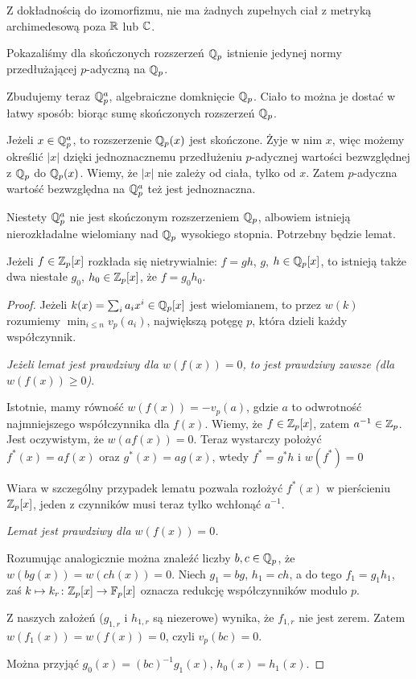\begin{fakt}
	Z dokładnością do izomorfizmu, nie ma żadnych zupełnych ciał z metryką archimedesową poza $\mathbb R$ lub $\mathbb C$.
\end{fakt}

Pokazaliśmy dla skończonych rozszerzeń $\mathbb Q_p$ istnienie jedynej normy przedłużającej $p$-adyczną na $\mathbb Q_p$.

Zbudujemy teraz $\mathbb Q_p^a$, algebraiczne domknięcie $\mathbb Q_p$.
Ciało to można je dostać w łatwy sposób: biorąc sumę skończonych rozszerzeń $\mathbb Q_p$.

Jeżeli $x \in \mathbb Q_p^a$, to rozszerzenie $\mathbb Q_p(x)$ jest skończone.
Żyje w nim $x$, więc możemy określić $|x|$ dzięki jednoznacznemu przedłużeniu $p$-adycznej wartości bezwzględnej z $\mathbb Q_p$ do $\mathbb Q_p(x)$.
Wiemy, że $|x|$ nie zależy od ciała, tylko od $x$.
Zatem $p$-adyczna wartość bezwzględna na $\mathbb Q_p^a$ też jest jednoznaczna.

Niestety $\mathbb Q_p^a$ nie jest skończonym rozszerzeniem $\mathbb Q_p$, albowiem istnieją nierozkładalne wielomiany nad $\mathbb Q_p$ wysokiego stopnia.
Potrzebny będzie lemat.

\begin{lemat}
	Jeżeli $f \in \mathbb Z_p[x]$ rozkłada się nietrywialnie: $f = gh$, $g$, $h \in \mathbb Q_p[x]$, to istnieją także dwa niestałe $g_0$, $h_0 \in \mathbb Z_p[x]$, że $f = g_0 h_0$.
\end{lemat}

\begin{proof}
	Jeżeli $k(x) = \sum_i a_i x^i \in \mathbb Q_p[x]$ jest wielomianem, to przez $w(k)$ rozumiemy $\min_{i \le n} v_p(a_i)$, największą potęgę $p$, która dzieli każdy współczynnik.

	\emph{Jeżeli lemat jest prawdziwy dla $w(f(x)) = 0$, to jest prawdziwy zawsze (dla $w(f(x)) \ge 0$)}.

	Istotnie, mamy równość $w(f(x)) = - v_p(a)$, gdzie $a$ to odwrotność najmniejszego współczynnika dla $f(x)$.
	Wiemy, że $f \in \mathbb Z_p[x]$, zatem $a^{-1} \in \mathbb Z_p$.
	Jest oczywistym, że $w(af(x)) = 0$.
	Teraz wystarczy położyć $f^*(x) = af(x)$ oraz $g^*(x) = ag(x)$, wtedy $f^* = g^*h$ i $w(f^*) =0$

	Wiara w szczególny przypadek lematu pozwala rozłożyć $f^*(x)$ w pierścieniu $\mathbb Z_p[x]$, jeden z czynników musi teraz tylko wchłonąć $a^{-1}$.

	\emph{Lemat jest prawdziwy dla $w(f(x)) = 0$.}

	Rozumując analogicznie można znaleźć liczby $b,c \in \mathbb Q_p$, że $w(bg(x)) = w(ch(x)) = 0$.
	Niech $g_1 = bg$, $h_1 = ch$, a do tego $f_1 = g_1 h_1$, zaś $k \mapsto k_r \colon \mathbb Z_p[x] \to \mathbb F_p[x]$ oznacza redukcję współczynników modulo $p$.

	Z naszych założeń ($g_{1,r}$ i $h_{1,r}$ są niezerowe) wynika, że $f_{1,r}$ nie jest zerem.
	Zatem $w(f_1(x)) = w(f(x)) = 0$, czyli $v_p(bc) = 0$.

	Można przyjąć $g_0(x) = (bc)^{-1}g_1(x)$, $h_0(x) = h_1(x)$.
\end{proof}

